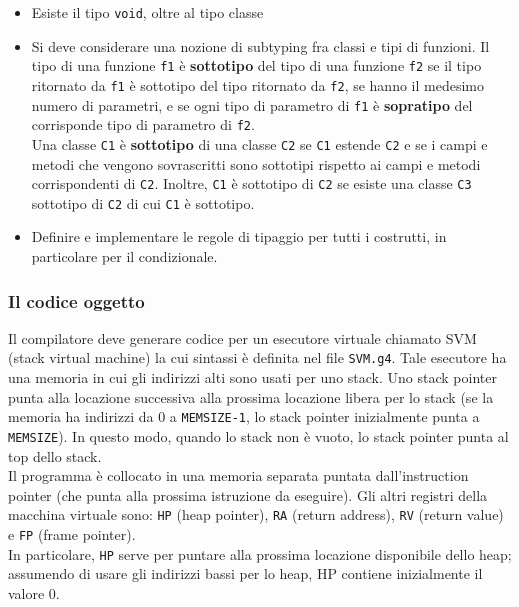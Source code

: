 \documentclass[a4paper]{article}   %
\begin{document}
\begin{itemize}
  \item Esiste il tipo \lstinline|void|, oltre al tipo classe

  \item Si deve considerare una nozione di subtyping fra classi e tipi di funzioni. Il tipo
  di una funzione \lstinline|f1| è \textbf{sottotipo} del tipo di una funzione \lstinline|f2| se il tipo ritornato da \lstinline|f1|
  è sottotipo del tipo ritornato da \lstinline|f2|, se hanno il medesimo numero di parametri, e se
  ogni tipo di parametro di \lstinline|f1| è \textbf{sopratipo} del corrisponde tipo di parametro di \lstinline|f2|.\\
  Una classe \lstinline|C1| è \textbf{sottotipo} di una classe \lstinline|C2| se \lstinline|C1| estende \lstinline|C2| e se i campi e metodi che
  vengono sovrascritti sono sottotipi rispetto ai campi e metodi corrispondenti di \lstinline|C2|.
  Inoltre, \lstinline|C1| è sottotipo di \lstinline|C2| se esiste una classe \lstinline|C3| sottotipo di \lstinline|C2| di cui \lstinline|C1| è
  sottotipo.

  \item Definire e implementare le regole di tipaggio per tutti i costrutti, in
  particolare per il condizionale.
\end{itemize}

\subsubsection{Il codice oggetto}
Il compilatore deve generare codice per un esecutore virtuale chiamato SVM (stack
virtual machine) la cui sintassi è definita nel file \lstinline|SVM.g4|. Tale esecutore ha una
memoria in cui gli indirizzi alti sono usati per uno stack. Uno stack pointer punta alla
locazione successiva alla prossima locazione libera per lo stack (se la memoria ha
indirizzi da 0 a \lstinline|MEMSIZE-1|, lo stack pointer inizialmente punta a \lstinline|MEMSIZE|).
In questo modo, quando lo stack non è vuoto, lo stack pointer punta al top dello stack.\\

Il programma è collocato in una memoria separata puntata dall'instruction pointer
(che punta alla prossima istruzione da eseguire). Gli altri registri della macchina
virtuale sono: \lstinline|HP| (heap pointer), \lstinline|RA| (return address), \lstinline|RV| (return value) e \lstinline|FP| (frame pointer).\\
In particolare, \lstinline|HP| serve per puntare alla prossima locazione disponibile dello
heap; assumendo di usare gli indirizzi bassi per lo heap, HP contiene inizialmente
il valore 0.\\
\end{document}
